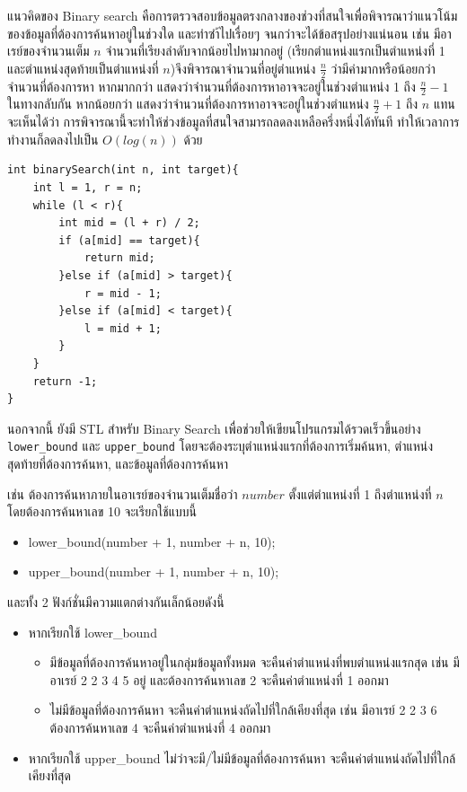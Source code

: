 แนวคิดของ Binary search คือการตรวจสอบข้อมูลตรงกลางของช่วงที่สนใจเพื่อพิจารณาว่าแนวโน้มของข้อมูลที่ต้องการค้นหาอยู่ในช่วงใด และทำซำ้ไปเรื่อยๆ จนกว่าจะได้ข้อสรุปอย่างแน่นอน เช่น มีอาเรย์ของจำนวนเต็ม $n$ จำนวนที่เรียงลำดับจากน้อยไปหามากอยู่ (เรียกตำแหน่งแรกเป็นตำแหน่งที่ 1 และตำแหน่งสุดท้ายเป็นตำแหน่งที่ $n$)จึงพิจารณาจำนวนที่อยู่ตำแหน่ง $\frac{n}{2}$ ว่ามีค่ามากหรือน้อยกว่าจำนวนที่ต้องการหา หากมากกว่า แสดงว่าจำนวนที่ต้องการหาอาจจะอยู่ในช่วงตำแหน่ง 1 ถึง $\frac{n}{2}-1$ ในทางกลับกัน หากน้อยกว่า แสดงว่าจำนวนที่ต้องการหาอาจจะอยู่ในช่วงตำแหน่ง $\frac{n}{2}+1$ ถึง $n$ แทน จะเห็นได้ว่า การพิจารณานี้จะทำให้ช่วงข้อมูลที่สนใจสามารถลดลงเหลือครึ่งหนึ่งได้ทันที ทำให้เวลาการทำงานก็ลดลงไปเป็น $O(log(n))$ ด้วย

\newpage

\begin{lstlisting}
int binarySearch(int n, int target){
	int l = 1, r = n;
	while (l < r){
		int mid = (l + r) / 2;
		if (a[mid] == target){
			return mid;
		}else if (a[mid] > target){
			r = mid - 1;
		}else if (a[mid] < target){
			l = mid + 1;
		}
	}
	return -1;
}
\end{lstlisting}

นอกจากนี้ ยังมี STL สำหรับ Binary Search เพื่อช่วยให้เขียนโปรแกรมได้รวดเร็วขึ้นอย่าง \texttt{lower\_bound} และ \texttt{upper\_bound} โดยจะต้องระบุตำแหน่งแรกที่ต้องการเริ่มค้นหา, ตำแหน่งสุดท้ายที่ต้องการค้นหา, และข้อมูลที่ต้องการค้นหา

เช่น ต้องการค้นหาภายในอาเรย์ของจำนวนเต็มชื่อว่า $number$ ตั้งแต่ตำแหน่งที่ 1 ถึงตำแหน่งที่ $n$ โดยต้องการค้นหาเลข 10 จะเรียกใช้แบบนี้
\begin{itemize}
\item lower\_bound(number + 1, number + n, 10);
\item upper\_bound(number + 1, number + n, 10);
\end{itemize}

\noindent และทั้ง 2 ฟังก์ชั่นมีความแตกต่างกันเล็กน้อยดังนี้
\begin{itemize}
\item หากเรียกใช้ lower\_bound
\begin{itemize}
\item มีข้อมูลที่ต้องการค้นหาอยู่ในกลุ่มข้อมูลทั้งหมด จะคืนค่าตำแหน่งที่พบตำแหน่งแรกสุด เช่น มีอาเรย์ 2 2 3 4 5 อยู่ และต้องการค้นหาเลข 2 จะคืนค่าตำแหน่งที่ 1 ออกมา
\item ไม่มีข้อมูลที่ต้องการค้นหา จะคืนค่าตำแหน่งถัดไปที่ใกล้เคียงที่สุด เช่น มีอาเรย์ 2 2 3 6 ต้องการค้นหาเลข 4 จะคืนค่าตำแหน่งที่ 4 ออกมา
\end{itemize}
\item หากเรียกใช้ upper\_bound ไม่ว่าจะมี/ไม่มีข้อมูลที่ต้องการค้นหา จะคืนค่าตำแหน่งถัดไปที่ใกล้เคียงที่สุด
\end{itemize}
